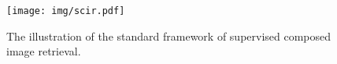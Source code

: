 \label{sec: meth_q}

\begin{figure}[!t]
		\centering
		\texttt{[image: img/scir.pdf]}
	    \caption{The illustration of the standard framework of supervised composed image retrieval.}\label{framework_scir}
\end{figure}

\begin{table*}
\scriptsize
\centering
 \caption{\textbf{Summarization of main supervised composed image retrieval approaches.}}
\end{table*}
